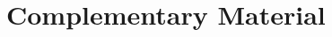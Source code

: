 \documentclass[handout,10pt]{beamer}
\begin{document}
\appendix
\section{Complementary Material}
	
	










\end{document}
